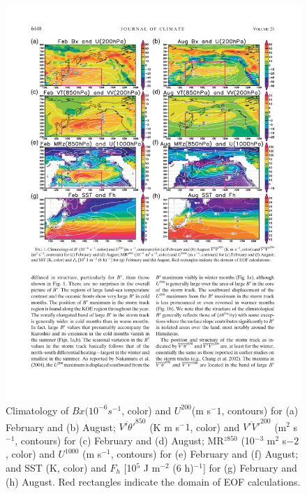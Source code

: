 \documentclass{ametsocv6.1}
\begin{document}
\begin{figure}[t]
\centerline{\includegraphics[width=\textwidth]{FigOne.pdf}}

\caption{Climatology of $Bx (10^{-6} s^{-1}$, color) and $U^{200}$(m s$^-1$,
contours) for (a) February and (b) August; $\overline{V'\theta'}^{850}$
(K m s$^-1$, color) and 
$\overline{V'V'}^{200}$
(m$^2$ s$^{-1}$, contours) for (c) February and (d) August; MR$^{z850}$ 
(10$^{-3}$ m$^2$ s$-2$, color) and $U^{1000}$ (m s$^{-1}$, contours) 
for (e) February and (f) August;
and SST (K, color) and $F_h$ [10$^5$ J m$^{-2}$ (6 h)$^{-1}$] for (g)
February and (h) August. Red rectangles indicate the domain of EOF
calculations.} \label{fig1} 
\end{figure}
\end{document}
